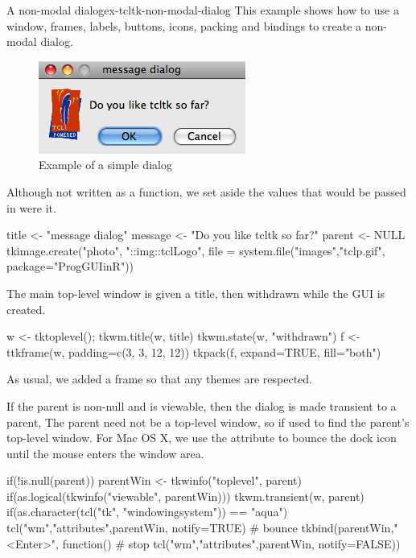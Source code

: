 \begin{example}{A non-modal dialog}{ex-tcltk-non-modal-dialog}
This example shows how to use  a window, frames,  labels, buttons,
icons, packing and bindings to create a non-modal dialog. 

\begin{figure}
  \centering
  \includegraphics[width=.4\textwidth]{fig-tcltk-simple-dialog.png}
  \caption{Example of a simple dialog}
  \label{fig:fig-tcltk-simple-dialog}
\end{figure}

Although not written as a function, we set aside the values that would
be passed in were it.
\begin{Schunk}
\begin{Sinput}
 title <- "message dialog"
 message <- "Do you like tcltk so far?"
 parent <- NULL
 tkimage.create("photo", "::img::tclLogo", 
                file = system.file("images","tclp.gif",
                  package="ProgGUIinR"))
\end{Sinput}
\end{Schunk}

The main top-level window is given a title, then withdrawn while
the GUI is created. 
\begin{Schunk}
\begin{Sinput}
 w <- tktoplevel(); tkwm.title(w, title)
 tkwm.state(w, "withdrawn")
 f <- ttkframe(w,  padding=c(3, 3, 12, 12))
 tkpack(f, expand=TRUE, fill="both")
\end{Sinput}
\end{Schunk}
As usual, we added a frame so that any themes are respected.

If the parent is non-null and is viewable, then the dialog is made
transient to a parent, The parent need not be a top-level window, so
 if used to find the parent's top-level window. For
Mac OS X, we use the  attribute to bounce the dock icon
until the mouse enters the window area.

\begin{Schunk}
\begin{Sinput}
 if(!is.null(parent)) {
   parentWin <- tkwinfo("toplevel", parent)
   if(as.logical(tkwinfo("viewable", parentWin))) {
     tkwm.transient(w, parent)
     if(as.character(tcl("tk", "windowingsystem")) == "aqua") {
       tcl("wm","attributes",parentWin, notify=TRUE) # bounce
       tkbind(parentWin,"<Enter>", function()        # stop
              tcl("wm","attributes",parentWin, notify=FALSE)) 
     }
   }
 }
\end{Sinput}
\end{Schunk}


\end{example}
